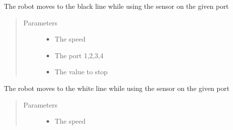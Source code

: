 \documentclass[letterpaper,10pt,english]{sphinxmanual}
\begin{document}
\begin{fulllineitems}

\begin{fulllineitems}
\label{\detokenize{spockbots:spockbots.motor.SpockbotsMotor.forward}}
\end{fulllineitems}


\begin{fulllineitems}
\label{\detokenize{spockbots:spockbots.motor.SpockbotsMotor.gotoblack}}
The robot moves to the black line while using the sensor on the given port
\begin{quote}\begin{description}
\item[{Parameters}] \leavevmode\begin{itemize}
\item {} 
 \textendash{} The speed

\item {} 
 \textendash{} The port 1,2,3,4

\item {} 
 \textendash{} The value to stop

\end{itemize}

\end{description}\end{quote}

\end{fulllineitems}


\begin{fulllineitems}
\label{\detokenize{spockbots:spockbots.motor.SpockbotsMotor.gotowhite}}
The robot moves to the white line while using the sensor on the given port
\begin{quote}\begin{description}
\item[{Parameters}] \leavevmode\begin{itemize}
\item {} 
 \textendash{} The speed


\end{itemize}
\end{description}
\end{quote}
\end{fulllineitems}
\end{fulllineitems}
\end{document}
